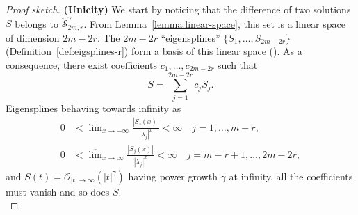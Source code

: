 \begin{proof}[Proof sketch]
  \textbf{(Unicity)} We start by noticing that the difference of two solutions $S$ belongs to 
  $\mathring{\mathscr{S}}_{2m, r}^{\gamma}$.  From Lemma~\ref{lemma:linear-space}, this set is a linear space of 
  dimension $2m-2r$. The $2m-2r$ ``eigensplines'' $\{S_1, \ldots, S_{2m-2r}\}$ (Definition~\ref{def:eigsplines-r}) form 
  a basis of this linear space (\cite[Lemma 3, Lecture 5]{schoenberg_cardinal_1973-1}). As a consequence, there exist 
  coefficients $c_1, \ldots, c_{2m-2r}$ such that
  \begin{equation}\label{eq:diff-expansion}
    S = \sum_{j=1}^{2m-2r} c_j S_{j}.
  \end{equation}
  Eigensplines behaving towards infinity as~\cite[(5.16), (5.17)]{lipow_cardinal_1973}
  \begin{align}
    0 &< \overline{\lim}_{x \to -\infty} \frac{|S_{j}(x)|}{|\lambda_{j}|^x} < \infty \quad j=1, \ldots, m-r, \\
    0 &< \overline{\lim}_{x \to \infty} \frac{|S_{j}(x)|}{|\lambda_{j}|^x} < \infty \quad j=m-r+1, \ldots, 2m-2r,
  \end{align}
  and $S(t) = \mathcal{O}_{|t|\to\infty}(|t|^{\gamma})$ having power growth $\gamma$ at infinity, all the coefficients 
  must vanish and so does $S$.  \\


\end{proof}
